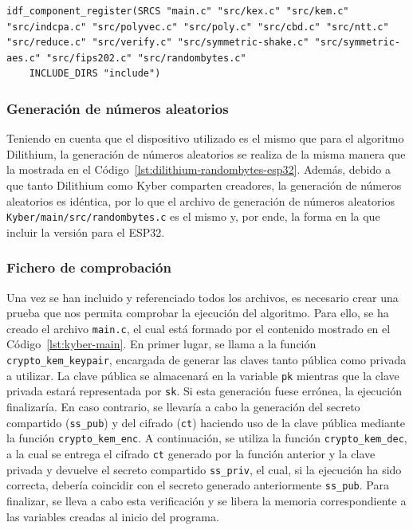 \begin{lstlisting}[label={lst:kyber-main-cmake},style=Bashnice,firstnumber=1,caption={Archivo \texttt{Kyber/main/CMakeLists.txt}.}]
idf_component_register(SRCS "main.c" "src/kex.c" "src/kem.c" "src/indcpa.c" "src/polyvec.c" "src/poly.c" "src/cbd.c" "src/ntt.c" "src/reduce.c" "src/verify.c" "src/symmetric-shake.c" "src/symmetric-aes.c" "src/fips202.c" "src/randombytes.c"
    INCLUDE_DIRS "include")
\end{lstlisting}

\subsubsection{Generación de números aleatorios}\label{subsubsec:kyber-random}

Teniendo en cuenta que el dispositivo utilizado es el mismo que para el algoritmo Dilithium, la generación de números aleatorios se realiza de la misma manera que la mostrada en el Código~\ref{lst:dilithium-randombytes-esp32}.
Además, debido a que tanto Dilithium como Kyber comparten creadores, la generación de números aleatorios es idéntica, por lo que el archivo de generación de números aleatorios \texttt{Kyber/main/src/randombytes.c} es el mismo y, por ende, la forma en la que incluir la versión para el ESP32.

\subsubsection{Fichero de comprobación}\label{subsubsec:kyber-main}

Una vez se han incluido y referenciado todos los archivos, es necesario crear una prueba que nos permita comprobar la ejecución del algoritmo.
Para ello, se ha creado el archivo \texttt{main.c}, el cual está formado por el contenido mostrado en el Código~\ref{lst:kyber-main}.
En primer lugar, se llama a la función \texttt{crypto\_kem\_keypair}, encargada de generar las claves tanto pública como privada a utilizar.
La clave pública se almacenará en la variable \texttt{pk} mientras que la clave privada estará representada por \texttt{sk}.
Si esta generación fuese errónea, la ejecución finalizaría.
En caso contrario, se llevaría a cabo la generación del secreto compartido (\texttt{ss\_pub}) y del cifrado (\texttt{ct}) haciendo uso de la clave pública mediante la función \texttt{crypto\_kem\_enc}.
A continuación, se utiliza la función \texttt{crypto\_kem\_dec}, a la cual se entrega el cifrado \texttt{ct} generado por la función anterior y la clave privada y devuelve el secreto compartido \texttt{ss\_priv}, el cual, si la ejecución ha sido correcta, debería coincidir con el secreto generado anteriormente \texttt{ss\_pub}.
Para finalizar, se lleva a cabo esta verificación y se libera la memoria correspondiente a las variables creadas al inicio del programa.

